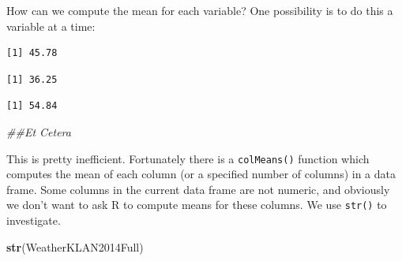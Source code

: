 \documentclass[
]{krantz}
\makeatletter
\newenvironment{Shaded}{\begin{snugshade}}{\end{snugshade}}
\newcommand{\CommentTok}[1]{\textcolor[rgb]{0.37,0.37,0.37}{\textit{#1}}}
\newcommand{\KeywordTok}[1]{\textcolor[rgb]{0.27,0.27,0.27}{\textbf{#1}}}
\newcommand{\NormalTok}[1]{#1}
\newcommand{\OperatorTok}[1]{\textcolor[rgb]{0.43,0.43,0.43}{\textbf{#1}}}
\newenvironment{kframe}{%
\medskip{}
\setlength{\fboxsep}{.8em}
 \def\at@end@of@kframe{}%
 \ifinner\ifhmode%
  \def\at@end@of@kframe{\end{minipage}}%
  \begin{minipage}{\columnwidth}%
 \fi\fi%
 \def\FrameCommand##1{\hskip\@totalleftmargin \hskip-\fboxsep
 \colorbox{shadecolor}{##1}\hskip-\fboxsep
     \hskip-\linewidth \hskip-\@totalleftmargin \hskip\columnwidth}%
 \MakeFramed {\advance\hsize-\width
   \@totalleftmargin\z@ \linewidth\hsize
   \@setminipage}}%
 {\par\unskip\endMakeFramed%
 \at@end@of@kframe}
\renewenvironment{Shaded}{\begin{kframe}}{\end{kframe}}
\makeatother
\begin{document}
How can we compute the mean for each variable? One possibility is to do this a variable at a time:

\begin{Shaded}
\end{Shaded}

\begin{verbatim}
[1] 45.78
\end{verbatim}

\begin{Shaded}
\end{Shaded}

\begin{verbatim}
[1] 36.25
\end{verbatim}

\begin{Shaded}
\end{Shaded}

\begin{verbatim}
[1] 54.84
\end{verbatim}

\begin{Shaded}
\begin{Highlighting}[]
\CommentTok{\#\#Et Cetera}
\end{Highlighting}
\end{Shaded}

This is pretty inefficient. Fortunately there is a \texttt{colMeans()} function which computes the mean of each column (or a specified number of columns) in a data frame. Some columns in the current data frame are not numeric, and obviously we don't want to ask R to compute means for these columns. We use \texttt{str()} to investigate.

\begin{Shaded}
\begin{Highlighting}[]
\KeywordTok{str}\NormalTok{(WeatherKLAN2014Full)}
\end{Highlighting}
\end{Shaded}
\end{document}
